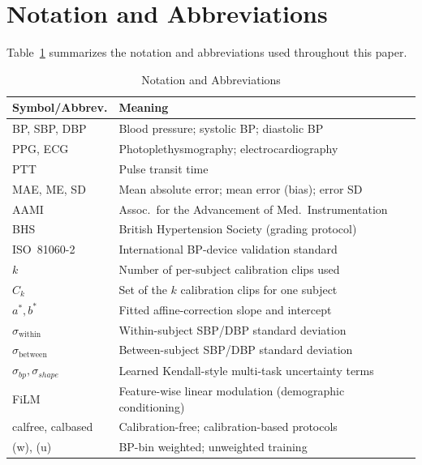 \documentclass[journal]{IEEEtran}
\begin{document}
\section{Notation and Abbreviations}
Table~\ref{tab:notation} summarizes the notation and abbreviations used throughout this paper.

\begin{table}[H]
\caption{Notation and Abbreviations}
\label{tab:notation}
\centering
\footnotesize
\begin{tabular}{lp{5.7cm}}
\toprule
Symbol/Abbrev. & Meaning \\
\midrule
BP, SBP, DBP & Blood pressure; systolic BP; diastolic BP \\
PPG, ECG & Photoplethysmography; electrocardiography \\
PTT & Pulse transit time \\
MAE, ME, SD & Mean absolute error; mean error (bias); error SD \\
AAMI & Assoc.\ for the Advancement of Med.\ Instrumentation \\
BHS & British Hypertension Society (grading protocol) \\
ISO~81060-2 & International BP-device validation standard \\
$k$ & Number of per-subject calibration clips used \\
$C_k$ & Set of the $k$ calibration clips for one subject \\
$a^\ast, b^\ast$ & Fitted affine-correction slope and intercept \\
$\sigma_{\mathrm{within}}$ & Within-subject SBP/DBP standard deviation \\
$\sigma_{\mathrm{between}}$ & Between-subject SBP/DBP standard deviation \\
$\sigma_{bp}, \sigma_{shape}$ & Learned Kendall-style multi-task uncertainty terms \\
FiLM & Feature-wise linear modulation (demographic conditioning) \\
calfree, calbased & Calibration-free; calibration-based protocols \\
(w), (u) & BP-bin weighted; unweighted training \\
\bottomrule
\end{tabular}
\end{table}
\end{document}
